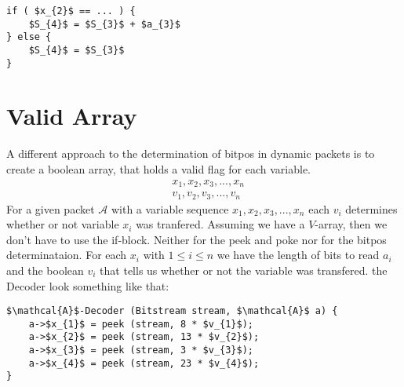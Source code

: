 \documentclass{article}
\begin{document}
		\begin{lstlisting}[mathescape]
if ( $x_{2}$ == ... ) {
	$S_{4}$ = $S_{3}$ + $a_{3}$
} else {
	$S_{4}$ = $S_{3}$
}
		\end{lstlisting}

	\section{Valid Array}
		A different approach to the determination of bitpos in dynamic packets is to create a boolean array, that holds a valid flag for each variable.
		\begin{align*}
			&x_{1}, x_{2}, x_{3}, ... , x_{n}\\
			&v_{1}, v_{2}, v_{3}, ... , v_{n}	
		\end{align*}
		For a given packet $\mathcal{A}$ with a variable sequence $x_{1}, x_{2}, x_{3}, ... , x_{n}$ each $v_{i}$ determines whether or not variable $x_{i}$ was tranfered.
		Assuming we have a $V$-array, then we don't have to use the if-block. Neither for the peek and poke nor for the bitpos determinataion.
		For each $x_{i}$ with $1\leq i\leq n$ we have the length of bits to read $a_{i}$ and the boolean $v_{i}$ that tells us whether or not the variable was transfered.
		the Decoder look something like that:
		\begin{lstlisting}[mathescape]
$\mathcal{A}$-Decoder (Bitstream stream, $\mathcal{A}$ a) {
	a->$x_{1}$ = peek (stream, 8 * $v_{1}$);
	a->$x_{2}$ = peek (stream, 13 * $v_{2}$);
	a->$x_{3}$ = peek (stream, 3 * $v_{3}$);
	a->$x_{4}$ = peek (stream, 23 * $v_{4}$);
}
		\end{lstlisting}
\end{document}
